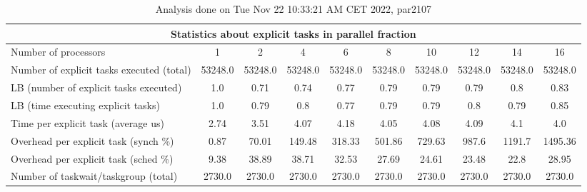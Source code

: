 \begin{table}[h]
\begin{center}
\begin{tabular}{|l|c|c|c|c|c|c|c|c|c|}
\hline
\multicolumn{10}{|c|}{Statistics about explicit tasks in parallel fraction} \\
\hline
\hline
Number of processors & 1 & 2 & 4 & 6 & 8 & 10 & 12 & 14 & 16 \\
\hline
\hline
Number of explicit tasks executed (total)        &         53248.0 &         53248.0 &         53248.0 &         53248.0 &         53248.0 &         53248.0 &         53248.0 &         53248.0 &         53248.0 \\
\hline
LB (number of explicit tasks executed)           &             1.0 &            0.71 &            0.74 &            0.77 &            0.79 &            0.79 &            0.79 &             0.8 &            0.83 \\
\hline
LB (time executing explicit tasks)               &             1.0 &            0.79 &             0.8 &            0.77 &            0.79 &            0.79 &             0.8 &            0.79 &            0.85 \\
\hline
Time per explicit task (average us)                 &            2.74 &            3.51 &            4.07 &            4.18 &            4.05 &            4.08 &            4.09 &             4.1 &             4.0 \\
\hline
Overhead per explicit task (synch \%)             &            0.87 &           70.01 &          149.48 &          318.33 &          501.86 &          729.63 &           987.6 &          1191.7 &         1495.36 \\
\hline
Overhead per explicit task (sched \%)             &            9.38 &           38.89 &           38.71 &           32.53 &           27.69 &           24.61 &           23.48 &            22.8 &           28.95 \\
\hline
Number of taskwait/taskgroup (total)             &          2730.0 &          2730.0 &          2730.0 &          2730.0 &          2730.0 &          2730.0 &          2730.0 &          2730.0 &          2730.0 \\
\hline
\end{tabular}
\end{center}
\caption{ Analysis done on Tue Nov 22 10:33:21 AM CET 2022, par2107}
\end{table}
